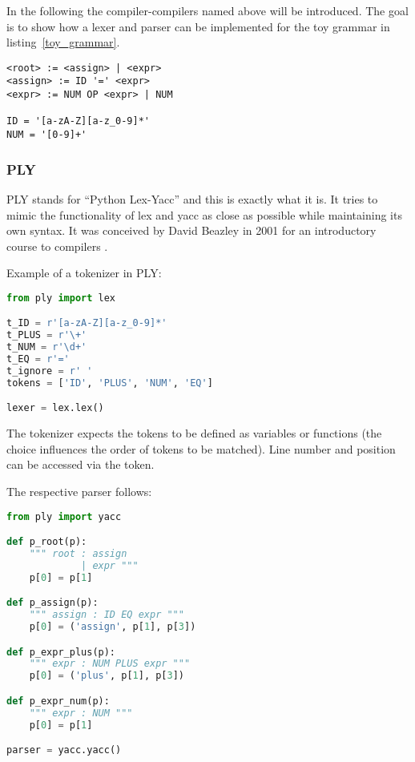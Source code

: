 \documentclass{scrartcl}
\begin{document}
In the following the compiler-compilers named above will be introduced. The goal
is to show how a lexer and parser can be implemented for the toy
grammar in listing~\ref{toy_grammar}.

\begin{lstlisting}[language=bnf, caption="A toy grammar", label=toy_grammar]
<root> := <assign> | <expr>
<assign> := ID '=' <expr>
<expr> := NUM OP <expr> | NUM

ID = '[a-zA-Z][a-z_0-9]*'
NUM = '[0-9]+'
\end{lstlisting}

\subsubsection{PLY}
\label{subsub:ply}
PLY stands for ``Python Lex-Yacc'' and this is exactly what it is. It tries to
mimic the functionality of lex and yacc as close as possible while maintaining
its own syntax. It was conceived by David Beazley in 2001 for an introductory
course to compilers \cite{website:ply}.

Example of a tokenizer in PLY:

\begin{lstlisting}[language=py, showstringspaces=false, caption=PLY Tokenizer]
from ply import lex

t_ID = r'[a-zA-Z][a-z_0-9]*'
t_PLUS = r'\+'
t_NUM = r'\d+'
t_EQ = r'='
t_ignore = r' '
tokens = ['ID', 'PLUS', 'NUM', 'EQ']

lexer = lex.lex()
\end{lstlisting}

The tokenizer expects the tokens to be defined as variables or functions (the
choice influences the order of tokens to be matched). Line number and position
can be accessed via the token.

The respective parser follows:
\begin{lstlisting}[language=py, showstringspaces=false, caption=PLY Yacc]
from ply import yacc

def p_root(p):
    """ root : assign
             | expr """
    p[0] = p[1]

def p_assign(p):
    """ assign : ID EQ expr """
    p[0] = ('assign', p[1], p[3])

def p_expr_plus(p):
    """ expr : NUM PLUS expr """
    p[0] = ('plus', p[1], p[3])

def p_expr_num(p):
    """ expr : NUM """
    p[0] = p[1]

parser = yacc.yacc()
\end{lstlisting}
\end{document}
